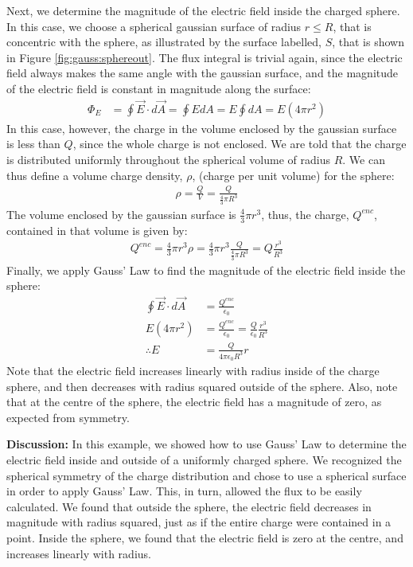 \begin{example}
Next, we determine the magnitude of the electric field inside the charged sphere. In this case, we choose a spherical gaussian surface of radius $r\leq R$, that is concentric with the sphere, as illustrated by the surface labelled, $S$, that is shown in Figure \ref{fig:gauss:sphereout}.
The flux integral is trivial again, since the electric field always makes the same angle with the gaussian surface, and the magnitude of the electric field is constant in magnitude along the surface:
\begin{align*}
\Phi_E&=\oint \vec E\cdot d\vec A=\oint E dA= E\oint dA=E(4\pi r^2)
\end{align*}
In this case, however, the charge in the volume enclosed by the gaussian surface is less than $Q$, since the whole charge is not enclosed. We are told that the charge is distributed uniformly throughout the spherical volume of radius $R$. We can thus define a volume charge density, $\rho$, (charge per unit volume) for the sphere:
\begin{align*}
\rho=\frac{Q}{V}=\frac{Q}{\frac{4}{3}\pi R^3}
\end{align*}
The volume enclosed by the gaussian surface is $\frac{4}{3}\pi r^3$, thus, the charge, $Q^{enc}$, contained in that volume is given by:
\begin{align*}
Q^{enc}=\frac{4}{3}\pi r^3 \rho=\frac{4}{3}\pi r^3 \frac{Q}{\frac{4}{3}\pi R^3}=Q\frac{r^3}{R^3}
\end{align*}
Finally, we apply Gauss' Law to find the magnitude of the electric field inside the sphere:
\begin{align*}
\oint \vec E\cdot d\vec A&=\frac{Q^{enc}}{\epsilon_0} \\
E(4\pi r^2) &= \frac{Q^{enc}}{\epsilon_0}=\frac{Q}{\epsilon_0}\frac{r^3}{R^3}\\
\therefore E&= \frac{Q}{4\pi\epsilon_0R^3}r
\end{align*}
Note that the electric field increases linearly with radius inside of the charge sphere, and then decreases with radius squared outside of the sphere. Also, note that at the centre of the sphere, the electric field has a magnitude of zero, as expected from symmetry.

\textbf{Discussion: } In this example, we showed how to use Gauss' Law to determine the electric field inside and outside of a uniformly charged sphere. We recognized the spherical symmetry of the charge distribution and chose to use a spherical surface in order to apply Gauss' Law. This, in turn, allowed the flux to be easily calculated. We found that outside the sphere, the electric field decreases in magnitude with radius squared, just as if the entire charge were contained in a point. Inside the sphere, we found that the electric field is zero at the centre, and increases linearly with radius. 
\end{example}

